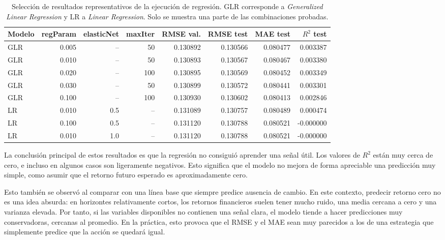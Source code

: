 \documentclass[runningheads]{llncs}
\begin{document}
\begin{table}[htbp]
\centering
\scriptsize
\begin{tabular}{lrrrrrrr}
\hline
Modelo & regParam & elasticNet & maxIter & RMSE val. & RMSE test & MAE test & $R^2$ test \\
\hline
GLR & 0.005 & --  & 50  & 0.130892 & 0.130566 & 0.080477 & 0.003387 \\
GLR & 0.010 & --  & 50  & 0.130893 & 0.130567 & 0.080467 & 0.003380 \\
GLR & 0.020 & --  & 100 & 0.130895 & 0.130569 & 0.080452 & 0.003349 \\
GLR & 0.030 & --  & 50  & 0.130899 & 0.130572 & 0.080441 & 0.003301 \\
GLR & 0.100 & --  & 100 & 0.130930 & 0.130602 & 0.080413 & 0.002846 \\
LR  & 0.010 & 0.5 & --  & 0.131089 & 0.130757 & 0.080489 & 0.000474 \\
LR  & 0.100 & 0.5 & --  & 0.131120 & 0.130788 & 0.080521 & -0.000000 \\
LR  & 0.010 & 1.0 & --  & 0.131120 & 0.130788 & 0.080521 & -0.000000 \\
\hline
\end{tabular}
\caption{Selección de resultados representativos de la ejecución de regresión. GLR corresponde a \textit{Generalized Linear Regression} y LR a \textit{Linear Regression}. Solo se muestra una parte de las combinaciones probadas.}
\label{tab:regresion_resultados}
\end{table}

La conclusión principal de estos resultados es que la regresión no consiguió aprender una señal útil. Los valores de $R^2$ están muy cerca de cero, e incluso en algunos casos son ligeramente negativos. Esto significa que el modelo no mejora de forma apreciable una predicción muy simple, como asumir que el retorno futuro esperado es aproximadamente cero.

Esto también se observó al comparar con una línea base que siempre predice ausencia de cambio. En este contexto, predecir retorno cero no es una idea absurda: en horizontes relativamente cortos, los retornos financieros suelen tener mucho ruido, una media cercana a cero y una varianza elevada. Por tanto, si las variables disponibles no contienen una señal clara, el modelo tiende a hacer predicciones muy conservadoras, cercanas al promedio. En la práctica, esto provoca que el RMSE y el MAE sean muy parecidos a los de una estrategia que simplemente predice que la acción se quedará igual.
\end{document}
